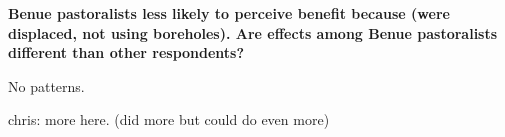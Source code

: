 \documentclass[
]{article}
\newenvironment{Shaded}{\begin{snugshade}}{\end{snugshade}}
\newcommand{\CommentTok}[1]{\textcolor[rgb]{0.56,0.35,0.01}{\textit{#1}}}
\newcommand{\DecValTok}[1]{\textcolor[rgb]{0.00,0.00,0.81}{#1}}
\newcommand{\FunctionTok}[1]{\textcolor[rgb]{0.00,0.00,0.00}{#1}}
\newcommand{\NormalTok}[1]{#1}
\newcommand{\OtherTok}[1]{\textcolor[rgb]{0.56,0.35,0.01}{#1}}
\newcommand{\SpecialCharTok}[1]{\textcolor[rgb]{0.00,0.00,0.00}{#1}}
\newcommand{\StringTok}[1]{\textcolor[rgb]{0.31,0.60,0.02}{#1}}
\begin{document}
\textbf{Benue pastoralists less likely to perceive benefit because (were
displaced, not using boreholes). Are effects among Benue pastoralists
different than other respondents?}

No patterns.

chris: more here. (did more but could do even more)

\begin{Shaded}
\end{Shaded}
\end{document}
